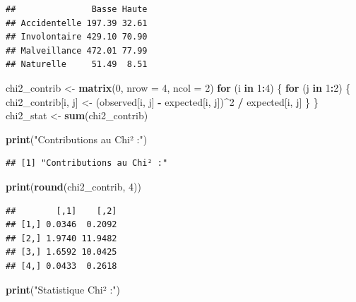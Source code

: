 \documentclass[
]{article}
\newenvironment{Shaded}{\begin{snugshade}}{\end{snugshade}}
\newcommand{\AttributeTok}[1]{\textcolor[rgb]{0.13,0.29,0.53}{#1}}
\newcommand{\ControlFlowTok}[1]{\textcolor[rgb]{0.13,0.29,0.53}{\textbf{#1}}}
\newcommand{\DecValTok}[1]{\textcolor[rgb]{0.00,0.00,0.81}{#1}}
\newcommand{\FunctionTok}[1]{\textcolor[rgb]{0.13,0.29,0.53}{\textbf{#1}}}
\newcommand{\NormalTok}[1]{#1}
\newcommand{\OtherTok}[1]{\textcolor[rgb]{0.56,0.35,0.01}{#1}}
\newcommand{\SpecialCharTok}[1]{\textcolor[rgb]{0.81,0.36,0.00}{\textbf{#1}}}
\newcommand{\StringTok}[1]{\textcolor[rgb]{0.31,0.60,0.02}{#1}}
\begin{document}
\begin{verbatim}
##               Basse Haute
## Accidentelle 197.39 32.61
## Involontaire 429.10 70.90
## Malveillance 472.01 77.99
## Naturelle     51.49  8.51
\end{verbatim}

\begin{Shaded}
\begin{Highlighting}[]
\NormalTok{chi2\_contrib }\OtherTok{\textless{}{-}} \FunctionTok{matrix}\NormalTok{(}\DecValTok{0}\NormalTok{, }\AttributeTok{nrow =} \DecValTok{4}\NormalTok{, }\AttributeTok{ncol =} \DecValTok{2}\NormalTok{)}
\ControlFlowTok{for}\NormalTok{ (i }\ControlFlowTok{in} \DecValTok{1}\SpecialCharTok{:}\DecValTok{4}\NormalTok{) \{}
  \ControlFlowTok{for}\NormalTok{ (j }\ControlFlowTok{in} \DecValTok{1}\SpecialCharTok{:}\DecValTok{2}\NormalTok{) \{}
\NormalTok{    chi2\_contrib[i, j] }\OtherTok{\textless{}{-}}\NormalTok{ (observed[i, j] }\SpecialCharTok{{-}}\NormalTok{ expected[i, j])}\SpecialCharTok{\^{}}\DecValTok{2} \SpecialCharTok{/}\NormalTok{ expected[i, j]}
\NormalTok{  \}}
\NormalTok{\}}
\NormalTok{chi2\_stat }\OtherTok{\textless{}{-}} \FunctionTok{sum}\NormalTok{(chi2\_contrib)}

\FunctionTok{print}\NormalTok{(}\StringTok{"Contributions au Chi² :"}\NormalTok{)}
\end{Highlighting}
\end{Shaded}

\begin{verbatim}
## [1] "Contributions au Chi² :"
\end{verbatim}

\begin{Shaded}
\begin{Highlighting}[]
\FunctionTok{print}\NormalTok{(}\FunctionTok{round}\NormalTok{(chi2\_contrib, }\DecValTok{4}\NormalTok{))}
\end{Highlighting}
\end{Shaded}

\begin{verbatim}
##        [,1]    [,2]
## [1,] 0.0346  0.2092
## [2,] 1.9740 11.9482
## [3,] 1.6592 10.0425
## [4,] 0.0433  0.2618
\end{verbatim}

\begin{Shaded}
\begin{Highlighting}[]
\FunctionTok{print}\NormalTok{(}\StringTok{"Statistique Chi² :"}\NormalTok{)}
\end{Highlighting}
\end{Shaded}
\end{document}
